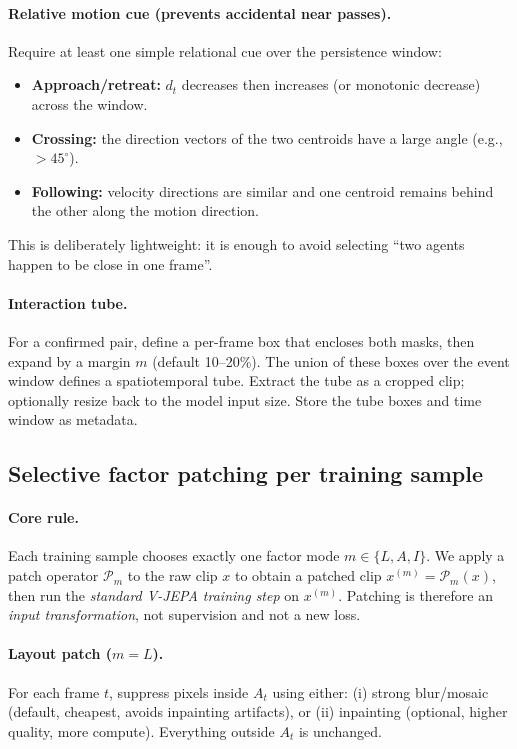 \paragraph{Relative motion cue (prevents accidental near passes).} Require at least one simple relational cue over the persistence window:
\begin{itemize}
  \item \textbf{Approach/retreat:} $d_t$ decreases then increases (or monotonic decrease) across the window.
  \item \textbf{Crossing:} the direction vectors of the two centroids have a large angle (e.g., $>45^\circ$).
  \item \textbf{Following:} velocity directions are similar and one centroid remains behind the other along the motion direction.
\end{itemize}
This is deliberately lightweight: it is enough to avoid selecting ``two agents happen to be close in one frame''.
\paragraph{Interaction tube.} For a confirmed pair, define a per-frame box that encloses both masks, then expand by a margin $m$ (default 10--20\%). The union of these boxes over the event window defines a spatiotemporal tube. Extract the tube as a cropped clip; optionally resize back to the model input size. Store the tube boxes and time window as metadata.

\subsection{Selective factor patching per training sample}\label{sec:surgery_selective_patching}
\paragraph{Core rule.} Each training sample chooses exactly one factor mode $m\in\{L,A,I\}$. We apply a patch operator $\mathcal{P}_m$ to the raw clip $x$ to obtain a patched clip $x^{(m)}=\mathcal{P}_m(x)$, then run the \emph{standard V-JEPA training step} on $x^{(m)}$. Patching is therefore an \emph{input transformation}, not supervision and not a new loss.
\paragraph{Layout patch ($m{=}L$).} For each frame $t$, suppress pixels inside $A_t$ using either:
(i) strong blur/mosaic (default, cheapest, avoids inpainting artifacts), or
(ii) inpainting (optional, higher quality, more compute).
Everything outside $A_t$ is unchanged.
